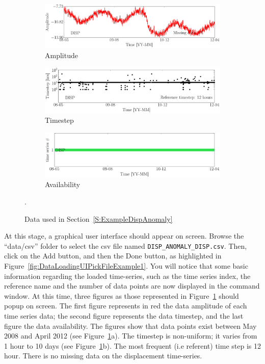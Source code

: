\begin{figure}[h!]
\centering
\begin{subfigure}{\linewidth}
\includegraphics[width=0.9\linewidth]{./docfigs/Example_DISPSIM_ANOMALY/raw/ALL_AMPLITUDES.pdf} 
\caption{Amplitude}
\end{subfigure}
\begin{subfigure}{\linewidth}
\includegraphics[width=0.9\linewidth]{./docfigs/Example_DISPSIM_ANOMALY/raw/ALL_TIMESTEPS.pdf}
\caption{Timestep}
\end{subfigure}
\begin{subfigure}{\linewidth}
\includegraphics[width=0.9\linewidth]{./docfigs/Example_DISPSIM_ANOMALY/raw/AVAILABILITY.pdf}
\caption{Availability}
\end{subfigure}
\caption{Data used in Section~\ref{S:ExampleDispAnomaly}}.
\label{fig:DataSummaryRaw3}
\end{figure}


At this stage, a graphical user interface should appear on screen. 
Browse the ``data/csv'' folder to select the csv file named \lstinline[basicstyle = \mlttfamily \small, backgroundcolor = \color{light-gray}]!DISP_ANOMALY_DISP.csv!.
Then, click on the Add button, and then the Done button, as highlighted in Figure~\ref{fig:DataLoadingUIPickFileExample1}.
You will notice that some basic information regarding the loaded time-series, such as the time series index, the reference name and the number of data points are now displayed in the \MATLAB{} command window.
At this time, three \MATLAB{} figures as those represented in Figure~\ref{fig:DataSummaryRaw3} should popup on screen.
The first figure represents in red the data amplitude of each time series data; the second figure represents the data timestep, and the last figure the data availability.
The figures show that data points exist between May 2008 and April 2012 (see Figure~\ref{fig:DataSummaryRaw3}a).
The timestep is non-uniform; it varies from 1 hour to 10 days (see Figure~\ref{fig:DataSummaryRaw3}b). 
The most frequent (i.e referent) time step is 12 hour.
There is no missing data on the displacement time-series.

